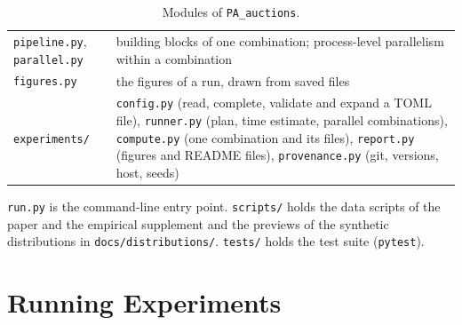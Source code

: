 \documentclass[11pt]{article}
\newcommand{\code}[1]{\texttt{#1}}
\begin{document}
\begin{table}[ht]
\begin{tabularx}{\linewidth}{@{}l L@{}}
\code{pipeline.py}, \code{parallel.py} & building blocks of one combination; process-level parallelism within a combination \\
\code{figures.py} & the figures of a run, drawn from saved files \\
\code{experiments/} & \code{config.py} (read, complete, validate and expand a TOML file), \code{runner.py} (plan, time estimate, parallel combinations), \code{compute.py} (one combination and its files), \code{report.py} (figures and README files), \code{provenance.py} (git, versions, host, seeds) \\
\bottomrule
\end{tabularx}
\caption{Modules of \code{PA\_auctions}.}
\label{tab:modules}
\end{table}

\code{run.py} is the command-line entry point. \code{scripts/} holds the data scripts of the paper and the empirical supplement and the previews of the synthetic distributions in \code{docs/distributions/}. \code{tests/} holds the test suite (\code{pytest}).

\section{Running Experiments}\label{sec:running}
\end{document}
